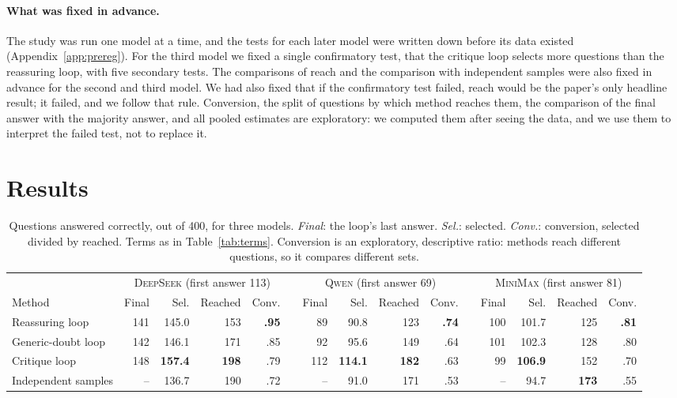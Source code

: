 \documentclass[11pt]{article}
\newcommand{\ds}{\textsc{DeepSeek}}
\newcommand{\qw}{\textsc{Qwen}}
\newcommand{\mm}{\textsc{MiniMax}}
\begin{document}
\paragraph{What was fixed in advance.}
The study was run one model at a time, and the tests for each later model were written down before its data existed (Appendix~\ref{app:prereg}).
For the third model we fixed a single confirmatory test, that the critique loop selects more questions than the reassuring loop, with five secondary tests.
The comparisons of reach and the comparison with independent samples were also fixed in advance for the second and third model.
We had also fixed that if the confirmatory test failed, reach would be the paper's only headline result; it failed, and we follow that rule.
Conversion, the split of questions by which method reaches them, the comparison of the final answer with the majority answer, and all pooled estimates are exploratory: we computed them after seeing the data, and we use them to interpret the failed test, not to replace it.

\section{Results}

\begin{table}[t]
\centering
\small
\setlength{\tabcolsep}{3.4pt}
\begin{tabular}{@{}l rrrr c rrrr c rrrr@{}}
\toprule
 & \multicolumn{4}{c}{\ds{} (first answer 113)} & & \multicolumn{4}{c}{\qw{} (first answer 69)} & & \multicolumn{4}{c}{\mm{} (first answer 81)} \\
\cmidrule(lr){2-5}\cmidrule(lr){7-10}\cmidrule(l){12-15}
Method & Final & Sel. & Reached & Conv. & & Final & Sel. & Reached & Conv. & & Final & Sel. & Reached & Conv. \\
\midrule
Reassuring loop & 141 & 145.0 & 153 & \textbf{.95} & & 89 & 90.8 & 123 & \textbf{.74} & & 100 & 101.7 & 125 & \textbf{.81} \\
Generic-doubt loop & 142 & 146.1 & 171 & .85 & & 92 & 95.6 & 149 & .64 & & 101 & 102.3 & 128 & .80 \\
Critique loop & 148 & \textbf{157.4} & \textbf{198} & .79 & & 112 & \textbf{114.1} & \textbf{182} & .63 & & 99 & \textbf{106.9} & 152 & .70 \\
Independent samples & -- & 136.7 & 190 & .72 & & -- & 91.0 & 171 & .53 & & -- & 94.7 & \textbf{173} & .55 \\
\bottomrule
\end{tabular}
\caption{Questions answered correctly, out of 400, for three models. \emph{Final}: the loop's last answer. \emph{Sel.}: selected. \emph{Conv.}: conversion, selected divided by reached. Terms as in Table~\ref{tab:terms}. Conversion is an exploratory, descriptive ratio: methods reach different questions, so it compares different sets.}
\label{tab:main}
\end{table}
\end{document}
